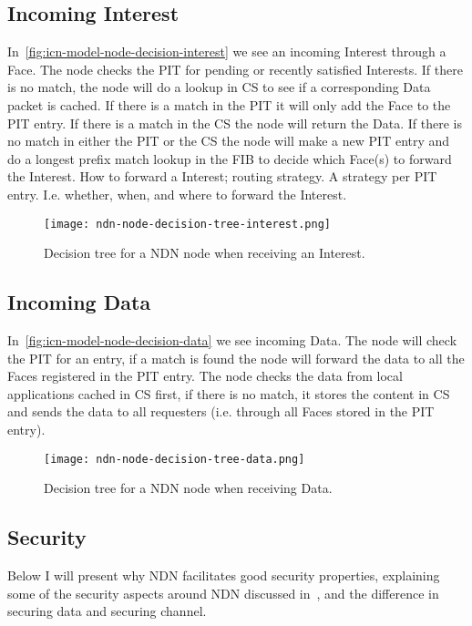 \subsection{Incoming Interest}\label{incoming-interest}
In~\autoref{fig:icn-model-node-decision-interest} we see an incoming Interest through a Face. 
The node checks the \gls{PIT} for pending or recently satisfied Interests. 
If there is no match, the node will do a lookup in \gls{CS} to see if a corresponding Data packet is cached. 
If there is a match in the \gls{PIT} it will only add the Face to the \gls{PIT} entry. If there is a match in the \gls{CS} the node will return the Data. 
If there is no match in either the \gls{PIT} or the \gls{CS} the node will make a new \gls{PIT} entry and do a longest prefix match lookup in the \gls{FIB} to decide which Face(s) to forward the Interest. 
How to forward a Interest; routing strategy. 
A strategy per \gls{PIT} entry. 
I.e. whether, when, and where to forward the Interest.
\begin{figure}[H]
  \centering
  \texttt{[image: ndn-node-decision-tree-interest.png]}
  \caption{Decision tree for a NDN node when receiving an Interest.}
  \label{fig:icn-model-node-decision-interest}
\end{figure}

\subsection{Incoming Data}
In~\autoref{fig:icn-model-node-decision-data} we see incoming Data.
The node will check  the \gls{PIT} for an entry, if a match is found the node will forward the data to all the Faces registered in the \gls{PIT} entry.
The node checks the data from local applications cached in \gls{CS} first, if there is no match, it stores the content in \gls{CS} and sends the data to all requesters (i.e. through all Faces stored in the \gls{PIT} entry).
\begin{figure}[H]
  \centering
  \texttt{[image: ndn-node-decision-tree-data.png]}
  \caption{Decision tree for a NDN node when receiving Data.}
  \label{fig:icn-model-node-decision-data}
\end{figure}


\subsection{Security}\label{ndn-security}
Below I will present why \gls{NDN} facilitates good security properties, explaining some of the security aspects around \gls{NDN} discussed in~\cite{secure-network-content}, and the difference in securing data and securing channel.

